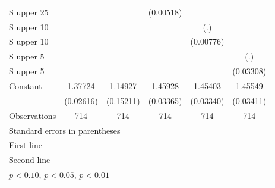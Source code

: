 \begin{table}[htbp]
\begin{tabular}{l*{5}{c}}
\addlinespace
S upper 25%
                    &                     &                     &   (0.00518)         &                     &                     \\
\addlinespace
S upper 10%
                    &                     &                     &                     &         (.)         &                     \\
\addlinespace
S upper 10%
                    &                     &                     &                     &   (0.00776)         &                     \\
\addlinespace
S upper 5%
                    &                     &                     &                     &                     &         (.)         \\
\addlinespace
S upper 5%
                    &                     &                     &                     &                     &   (0.03308)         \\
\addlinespace
Constant            &     1.37724\sym{***}&     1.14927\sym{***}&     1.45928\sym{***}&     1.45403\sym{***}&     1.45549\sym{***}\\
                    &   (0.02616)         &   (0.15211)         &   (0.03365)         &   (0.03340)         &   (0.03411)         \\
\midrule
Observations        &         714         &         714         &         714         &         714         &         714         \\
\bottomrule
\multicolumn{6}{l}{\footnotesize Standard errors in parentheses}\\
\multicolumn{6}{l}{\footnotesize First line}\\
\multicolumn{6}{l}{\footnotesize Second line}\\
\multicolumn{6}{l}{\footnotesize \sym{*} \(p<0.10\), \sym{**} \(p<0.05\), \sym{***} \(p<0.01\)}\\
\end{tabular}
\end{table}

